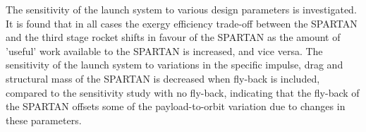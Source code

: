 The sensitivity of the launch system to various design parameters is investigated. It is found that in all cases the exergy efficiency trade-off between the SPARTAN and the third stage rocket shifts in favour of the SPARTAN as the amount of 'useful' work available to the SPARTAN is increased, and vice versa. 
The sensitivity of the launch system to variations in the specific impulse, drag and structural mass of the SPARTAN is decreased when fly-back is included, compared to the sensitivity study with no fly-back, indicating that the fly-back of the SPARTAN offsets some of the payload-to-orbit variation due to changes in these parameters. 

